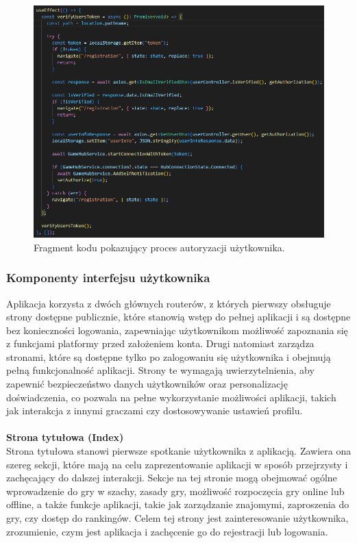 \documentclass[12pt,a4paper]{article}
\begin{document}
\begin{figure}[h!]
    \centering
    \includegraphics[width=1\textwidth]{zdj/mrouter_authorization.png}
    \caption{Fragment kodu pokazujący proces autoryzacji użytkownika.}
\end{figure}

\newpage
\subsubsection{Komponenty interfejsu użytkownika}

Aplikacja korzysta z dwóch głównych routerów, z których pierwszy obsługuje strony dostępne publicznie, które stanowią wstęp do pełnej aplikacji i są dostępne bez konieczności logowania, zapewniając użytkownikom możliwość zapoznania się z funkcjami platformy przed założeniem konta. Drugi natomiast zarządza stronami, które są dostępne tylko po zalogowaniu się użytkownika i obejmują pełną funkcjonalność aplikacji. Strony te wymagają uwierzytelnienia, aby zapewnić bezpieczeństwo danych użytkowników oraz personalizację doświadczenia, co pozwala na pełne wykorzystanie możliwości aplikacji, takich jak interakcja z innymi graczami czy dostosowywanie ustawień profilu.
\\\\

\textbf{Strona tytułowa (Index)}\\
Strona tytułowa stanowi pierwsze spotkanie użytkownika z aplikacją. Zawiera ona szereg sekcji, które mają na celu zaprezentowanie aplikacji w sposób przejrzysty i zachęcający do dalszej interakcji. Sekcje na tej stronie mogą obejmować ogólne wprowadzenie do gry w szachy, zasady gry, możliwość rozpoczęcia gry online lub offline, a także funkcje aplikacji, takie jak zarządzanie znajomymi, zaproszenia do gry, czy dostęp do rankingów. Celem tej strony jest zainteresowanie użytkownika, zrozumienie, czym jest aplikacja i zachęcenie go do rejestracji lub logowania.
\\
\end{document}
